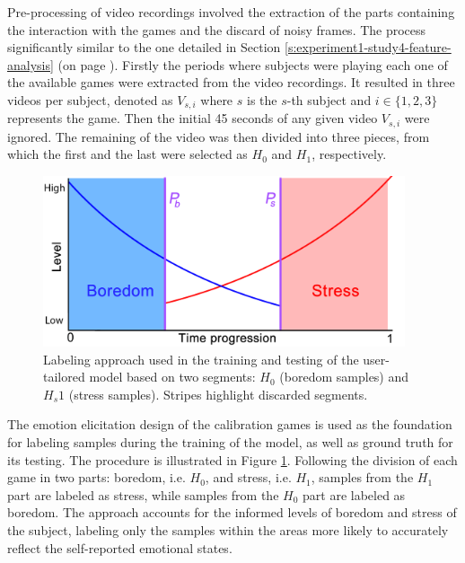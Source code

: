 Pre-processing of video recordings involved the extraction of the parts containing the interaction with the games and the discard of noisy frames. The process significantly similar to the one detailed in Section \ref{s:experiment1-study4-feature-analysis} (on page \pageref{s:experiment1-study4-feature-analysis}). Firstly the periods where subjects were playing each one of the available games were extracted from the video recordings. It resulted in three videos per subject, denoted as $V_{s,i}$ where $s$ is the $s$-th subject and $i \in \{1, 2, 3\}$ represents the game. Then the initial 45 seconds of any given video $V_{s,i}$ were ignored. The remaining of the video was then divided into three pieces, from which the first and the last were selected as $H_0$ and $H_1$, respectively.

\begin{figure}[h]
    \centering
    \includegraphics[width=0.95\textwidth]{figures/machine-learning-labeling-approach.png}
    \caption{Labeling approach used in the training and testing of the user-tailored model based on two segments: $H_0$ (boredom samples) and $H_s1$ (stress samples). Stripes highlight discarded segments.}
    \label{fig:machine-learning-labeling-approach}
\end{figure}

The emotion elicitation design of the calibration games is used as the foundation for labeling samples during the training of the model, as well as ground truth for its testing. The procedure is illustrated in Figure \ref{fig:machine-learning-labeling-approach}. Following the division of each game in two parts: boredom, i.e. $H_0$, and stress, i.e. $H_1$, samples from the $H_1$ part are labeled as stress, while samples from the $H_0$ part are labeled as boredom. The approach accounts for the informed levels of boredom and stress of the subject, labeling only the samples within the areas more likely to accurately reflect the self-reported emotional states.

